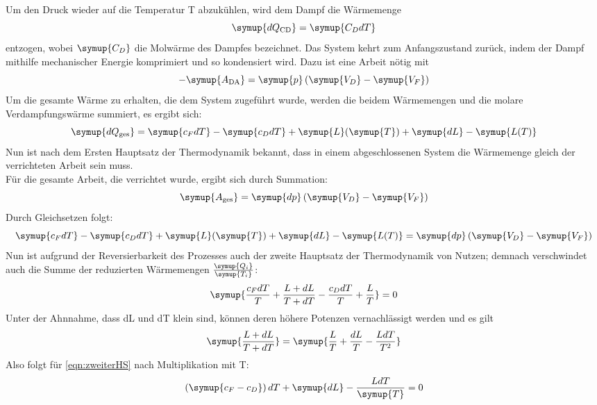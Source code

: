Um den Druck wieder auf die Temperatur T abzukühlen, wird dem Dampf die Wärmemenge
\begin{equation*}
\symup{dQ_\text{CD}} = \symup{C_D dT}
\end{equation*}
entzogen, wobei $\symup{C_D}$ die Molwärme des Dampfes bezeichnet. Das System kehrt zum Anfangszustand
zurück, indem der Dampf mithilfe mechanischer Energie komprimiert und so kondensiert wird. Dazu ist 
eine Arbeit nötig mit
\begin{equation*}
- \symup{A_{\text{DA}}} = \symup{p} \left( \symup{V_D} - \symup{V_F} \right)
\end{equation*}
Um die gesamte Wärme zu erhalten, die dem System zugeführt wurde, werden die beidem Wärmemengen und
die molare Verdampfungswärme summiert, es ergibt sich:
\begin{equation*}
\symup{dQ_\text{ges}} = \symup{c_F dT} - \symup{c_D dT} + \symup{L}(\symup{T}) + \symup{dL} - \symup{L(T)}
\end{equation*}
Nun ist nach dem Ersten Hauptsatz der Thermodynamik bekannt, dass in einem abgeschlossenen System die Wärmemenge gleich der verrichteten Arbeit 
sein muss.\\
Für die gesamte Arbeit, die verrichtet wurde, ergibt sich durch Summation:
\begin{equation*}
\symup{A_\text{ges}} = \symup{dp} \left( \symup{V_D} - \symup{V_F} \right)
\end{equation*}
Durch Gleichsetzen folgt:
\begin{equation}
\symup{c_F dT} - \symup{c_D dT} + \symup{L}(\symup{T}) + \symup{dL} - \symup{L(T)} = \symup{dp} \left( \symup{V_D} - \symup{V_F} \right)
\label{eqn:ersterHS}
\end{equation}
Nun ist aufgrund der Reversierbarkeit des Prozesses auch der zweite Hauptsatz der
Thermodynamik von Nutzen; demnach verschwindet auch die Summe der reduzierten
Wärmemengen $\frac{\symup{Q_i}}{\symup{T_i}}$:
\begin{equation}
\symup{\frac{c_F dT}{T} + \frac{L + dL}{T + dT} - \frac{c_D dT}{T} + \frac{L}{T}} = 0
\label{eqn:zweiterHS}
\end{equation}
Unter der Ahnnahme, dass dL und dT klein sind, können deren höhere Potenzen 
vernachlässigt werden und es gilt
\begin{equation*}
\symup{\frac{L + dL}{T + dT}} = \symup{\frac{L}{T} + \frac{dL}{T} - \frac{L dT}{T^2}}
\end{equation*}
Also folgt für \eqref{eqn:zweiterHS} nach Multiplikation mit T:
\begin{equation*}
\left( \symup{c_F - c_D} \right) dT + \symup{dL} - \frac{L dT}{\symup{T}} = 0
\end{equation*}
